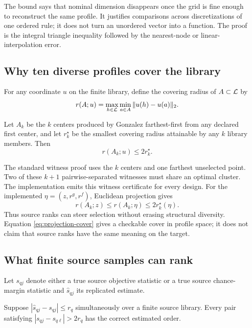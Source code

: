 The bound says that nominal dimension disappears once the grid is fine enough
to reconstruct the same profile.  It justifies comparisons across
discretizations of one ordered rule; it does not turn an unordered vector into
a function.  The proof is the integral triangle inequality followed by the
nearest-node or linear-interpolation error.

\subsection{Why ten diverse profiles cover the library}

For any coordinate $u$ on the finite library, define the covering radius of
$A\subset\mathcal{L}$ by
\[
 r(A;u)=\max_{h\in\mathcal{L}}\min_{a\in A}\|u(h)-u(a)\|_2.
\]

\begin{theorem}
\label{thm:farthest-first}
Let $A_k$ be the $k$ centers produced by Gonzalez farthest-first from any
declared first center, and let $r_k^\star$ be the smallest covering radius
attainable by any $k$ library members.  Then
\[
 r(A_k;u)\le 2r_k^\star.
\]
\end{theorem}

The standard witness proof uses the $k$ centers and one farthest unselected
point.  Two of these $k+1$ pairwise-separated witnesses must share an optimal
cluster.  The implementation emits this witness certificate for every design.
For the implemented $\eta=(z,r^g,r^f)$, Euclidean projection gives
\begin{equation}\label{eq:projection-cover}
 r(A_k;z)\le r(A_k;\eta)\le2r_k^\star(\eta).
\end{equation}
Thus source ranks can steer selection without erasing structural diversity.
Equation \eqref{eq:projection-cover} gives a checkable cover in profile space;
it does not claim that source ranks have the same meaning on the target.

\subsection{What finite source samples can rank}

Let $s_{qj}$ denote either a true source objective statistic or a true source
chance-margin statistic and $\widehat s_{qj}$ its replicated estimate.

\begin{proposition}\label{prop:rank-recovery}
Suppose $|\widehat s_{qj}-s_{qj}|\le r_q$ simultaneously over a finite source
library.  Every pair satisfying $|s_{qj}-s_{q\ell}|>2r_q$ has the correct
estimated order.
\end{proposition}

